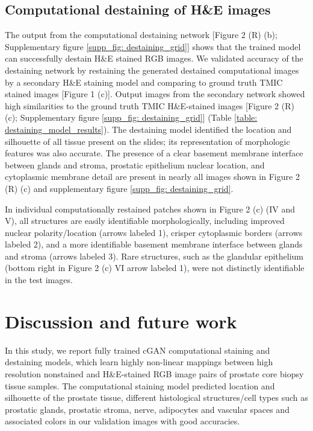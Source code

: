 \documentclass[10pt, conference, compsocconf]{IEEEtran}
\begin{document}
\subsection{Computational destaining of H\&E images}
The output from the computational destaining network [Figure 2 (R) (b); Supplementary figure \ref{supp_fig: destaining_grid}] shows that the trained model can successfully destain H\&E stained RGB images. We validated accuracy of the destaining network by restaining the generated destained computational images by a secondary H\&E staining model and comparing to ground truth TMIC stained images [Figure 1 (c)]. Output images from the secondary network showed high similarities to the ground truth TMIC H\&E-stained images [Figure 2 (R) (c); Supplementary figure \ref{supp_fig: destaining_grid}] (Table \ref{table: destaining_model_results}). The destaining model identified the location and silhouette of all tissue present on the slides; its representation of morphologic features was also accurate. The presence of a clear basement membrane interface between glands and stroma, prostatic epithelium nuclear location, and cytoplasmic membrane detail are present in nearly all images shown in Figure 2 (R) (c) and supplementary figure \ref{supp_fig: destaining_grid}.

In individual computationally restained patches shown in Figure 2 (c) (IV and V), all structures are easily identifiable morphologically, including improved nuclear polarity/location (arrows labeled 1), crisper cytoplasmic borders (arrows labeled 2), and a more identifiable basement membrane interface between glands and stroma (arrows labeled 3). Rare structures, such as the glandular epithelium (bottom right in Figure 2 (c) VI arrow labeled 1), were not distinctly identifiable in the test images.

\section{Discussion and future work}
In this study, we report fully trained cGAN computational staining and destaining models, which learn highly non-linear mappings between high resolution nonstained and H\&E-stained RGB image pairs of prostate core biopsy tissue samples. The computational staining model predicted location and silhouette of the prostate tissue, different histological structures/cell types such as prostatic glands, prostatic stroma, nerve, adipocytes and vascular spaces and associated colors in our validation images with good accuracies.
\end{document}
